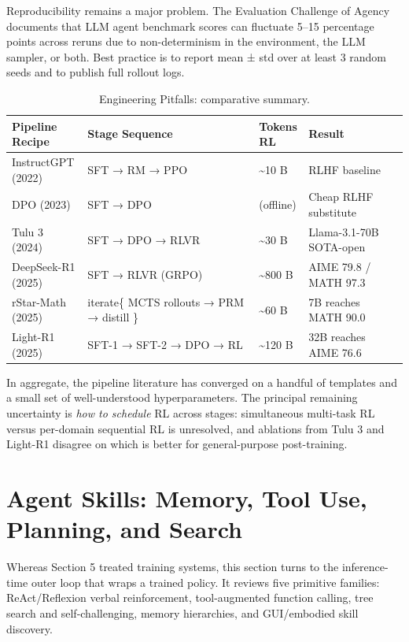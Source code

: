 \documentclass{article}
\begin{document}
Reproducibility remains a major problem. The Evaluation Challenge of Agency \citep{dong20262026} documents that LLM agent benchmark scores can fluctuate 5--15 percentage points across reruns due to non-determinism in the environment, the LLM sampler, or both. Best practice is to report mean ± std over at least 3 random seeds and to publish full rollout logs.

\begin{table}[t]
\centering
\caption{Engineering Pitfalls: comparative summary.}
\label{tab:engineering-pitfalls}
\begin{tabular}{>{\raggedright\arraybackslash}p{0.1957\linewidth}
  >{\raggedright\arraybackslash}p{0.4348\linewidth}
  >{\raggedright\arraybackslash}p{0.1196\linewidth}
  >{\raggedright\arraybackslash}p{0.2500\linewidth}}
\toprule
Pipeline Recipe & Stage Sequence & Tokens RL & Result \\
\midrule
InstructGPT (2022) & SFT → RM → PPO & \textasciitilde10 B & RLHF baseline \\
DPO (2023) & SFT → DPO & 0 (offline) & Cheap RLHF substitute \\
Tulu 3 (2024) & SFT → DPO → RLVR & \textasciitilde30 B & Llama-3.1-70B SOTA-open \\
DeepSeek-R1 (2025) & SFT → RLVR (GRPO) & \textasciitilde800 B & AIME 79.8 / MATH 97.3 \\
rStar-Math (2025) & iterate\{ MCTS rollouts → PRM → distill \} & \textasciitilde60 B & 7B reaches MATH 90.0 \\
Light-R1 (2025) & SFT-1 → SFT-2 → DPO → RL & \textasciitilde120 B & 32B reaches AIME 76.6 \\
\end{tabular}
\end{table}

In aggregate, the pipeline literature has converged on a handful of templates and a small set of well-understood hyperparameters. The principal remaining uncertainty is \emph{how to schedule} RL across stages: simultaneous multi-task RL versus per-domain sequential RL is unresolved, and ablations from Tulu 3 and Light-R1 disagree on which is better for general-purpose post-training.

\section{Agent Skills: Memory, Tool Use, Planning, and Search}\label{agent-skills-memory-tool-use-planning-and-search}

Whereas Section 5 treated training systems, this section turns to the inference-time outer loop that wraps a trained policy. It reviews five primitive families: ReAct/Reflexion verbal reinforcement, tool-augmented function calling, tree search and self-challenging, memory hierarchies, and GUI/embodied skill discovery.
\end{document}
